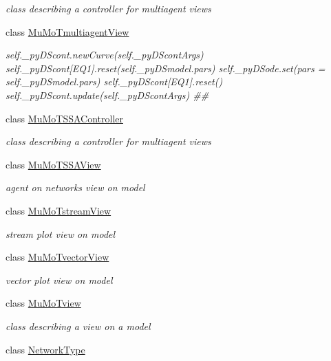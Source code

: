 \begin{DoxyCompactItemize}
\begin{DoxyCompactList}\small\item\em class describing a controller for multiagent views \end{DoxyCompactList}\item 
class \hyperlink{class_mu_mo_t_1_1_mu_mo_tmultiagent_view}{Mu\+Mo\+Tmultiagent\+View}
\begin{DoxyCompactList}\small\item\em self.\+\_\+py\+D\+Scont.\+new\+Curve(self.\+\_\+py\+D\+Scont\+Args) self.\+\_\+py\+D\+Scont\mbox{[}\textquotesingle{}E\+Q1\textquotesingle{}\mbox{]}.reset(self.\+\_\+py\+D\+Smodel.\+pars) self.\+\_\+py\+D\+Sode.\+set(pars = self.\+\_\+py\+D\+Smodel.\+pars) self.\+\_\+py\+D\+Scont\mbox{[}\textquotesingle{}E\+Q1\textquotesingle{}\mbox{]}.reset() self.\+\_\+py\+D\+Scont.\+update(self.\+\_\+py\+D\+Scont\+Args) \#\# \end{DoxyCompactList}\item 
class \hyperlink{class_mu_mo_t_1_1_mu_mo_t_s_s_a_controller}{Mu\+Mo\+T\+S\+S\+A\+Controller}
\begin{DoxyCompactList}\small\item\em class describing a controller for multiagent views \end{DoxyCompactList}\item 
class \hyperlink{class_mu_mo_t_1_1_mu_mo_t_s_s_a_view}{Mu\+Mo\+T\+S\+S\+A\+View}
\begin{DoxyCompactList}\small\item\em agent on networks view on model \end{DoxyCompactList}\item 
class \hyperlink{class_mu_mo_t_1_1_mu_mo_tstream_view}{Mu\+Mo\+Tstream\+View}
\begin{DoxyCompactList}\small\item\em stream plot view on model \end{DoxyCompactList}\item 
class \hyperlink{class_mu_mo_t_1_1_mu_mo_tvector_view}{Mu\+Mo\+Tvector\+View}
\begin{DoxyCompactList}\small\item\em vector plot view on model \end{DoxyCompactList}\item 
class \hyperlink{class_mu_mo_t_1_1_mu_mo_tview}{Mu\+Mo\+Tview}
\begin{DoxyCompactList}\small\item\em class describing a view on a model \end{DoxyCompactList}\item 
class \hyperlink{class_mu_mo_t_1_1_network_type}{Network\+Type}
\end{DoxyCompactItemize}
